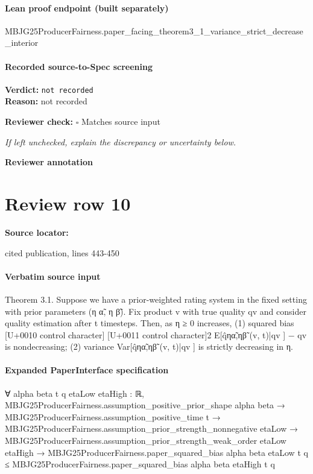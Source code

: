 \documentclass[10pt]{article}
\newcommand{\reviewerbox}{%
  \par\noindent\fbox{\parbox{0.96\linewidth}{\rule{0pt}{0.38in}}}\par
}
\newcommand{\reviewmatch}[1]{%
  \par\noindent\textbf{Reviewer check:} $\square$\; #1\par
  \noindent\emph{If left unchecked, explain the discrepancy or uncertainty below.}\par
}
\begin{document}
\paragraph{Lean proof endpoint (built separately)}\begin{ReviewVerbatim}
MBJG25ProducerFairness.paper_facing_theorem3_1_variance_strict_decrease_interior
\end{ReviewVerbatim}

\paragraph{Recorded source-to-Spec screening}
\textbf{Verdict:} \texttt{not recorded}
\\
\textbf{Reason:} not recorded
\reviewmatch{Matches source input}
\noindent\textbf{Reviewer annotation}\par
\reviewerbox
\clearpage
\hypertarget{source-claim-5564d9d725c13f20}{}
\section*{Review row 10}
\textbf{Source locator:} {\footnotesize\raggedright cited publication, lines 443-\allowbreak{}450\par}
\paragraph{Verbatim source input}
\begin{ReviewVerbatim}
Theorem 3.1. Suppose we have a prior-weighted rating system in the fixed setting with prior parameters (η α̃, η β̃). Fix
product v with true quality qv and consider quality estimation after t timesteps.
Then, as η
≥ 0 increases, (1) squared bias
[U+0010 control character]
[U+0011 control character]2
E[q̂ηα̃,ηβ̃ (v, t)|qv ] − qv
is nondecreasing; (2) variance Var[q̂ηα̃,ηβ̃ (v, t)|qv ] is strictly decreasing in η.
\end{ReviewVerbatim}


\paragraph{Expanded PaperInterface specification}
\begin{ReviewVerbatim}
∀ {alpha beta t q etaLow etaHigh : ℝ},
  MBJG25ProducerFairness.assumption_positive_prior_shape alpha beta →
    MBJG25ProducerFairness.assumption_positive_time t →
      MBJG25ProducerFairness.assumption_prior_strength_nonnegative etaLow →
        MBJG25ProducerFairness.assumption_prior_strength_weak_order etaLow etaHigh →
          MBJG25ProducerFairness.paper_squared_bias alpha beta etaLow t q ≤
            MBJG25ProducerFairness.paper_squared_bias alpha beta etaHigh t q
\end{ReviewVerbatim}
\end{document}
